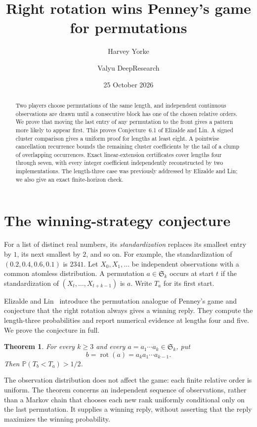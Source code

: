 \documentclass[11pt]{amsart}
\title{Right rotation wins Penney's game for permutations}
\author{Harvey Yorke}
\author{Valyu DeepResearch}
\date{25 October 2026}
\newtheorem{theorem}{Theorem}[section]
\theoremstyle{remark}
\newcommand{\Prb}{\mathbb P}
\newcommand{\Sg}{\mathfrak S}
\newcommand{\rot}{\operatorname{rot}}
\begin{document}
\raggedbottom
\begin{abstract}
Two players choose permutations of the same length, and independent continuous observations are drawn until a consecutive block has one of the chosen relative orders. We prove that moving the last entry of any permutation to the front gives a pattern more likely to appear first. This proves Conjecture~6.1 of Elizalde and Lin. A signed cluster comparison gives a uniform proof for lengths at least eight. A pointwise cancellation recurrence bounds the remaining cluster coefficients by the tail of a clump of overlapping occurrences. Exact linear-extension certificates cover lengths four through seven, with every integer coefficient independently reconstructed by two implementations. The length-three case was previously addressed by Elizalde and Lin; we also give an exact finite-horizon check.
\end{abstract}
\maketitle

\section{The winning-strategy conjecture}

For a list of distinct real numbers, its \emph{standardization} replaces its smallest entry by $1$, its next smallest by $2$, and so on. For example, the standardization of $(0.2,0.4,0.6,0.1)$ is $2341$. Let $X_0,X_1,\ldots$ be independent observations with a common atomless distribution. A permutation $a\in\Sg_k$ occurs at start $t$ if the standardization of $(X_t,\ldots,X_{t+k-1})$ is $a$. Write $T_a$ for its first start.

Elizalde and Lin~\cite{ElizaldeLin2026} introduce the permutation analogue of Penney's game and conjecture that the right rotation always gives a winning reply. They compute the length-three probabilities and report numerical evidence at lengths four and five. We prove the conjecture in full.

\begin{theorem}\label{thm:main}
For every $k\ge3$ and every $a=a_1\cdots a_k\in\Sg_k$, put
\[
 b=\rot(a)=a_ka_1\cdots a_{k-1}.
\]
Then $\Prb(T_b<T_a)>1/2$.
\end{theorem}

The observation distribution does not affect the game: each finite relative order is uniform. The theorem concerns an independent sequence of observations, rather than a Markov chain that chooses each new rank uniformly conditional only on the last permutation. It supplies a winning reply, without asserting that the reply maximizes the winning probability.
\end{document}
